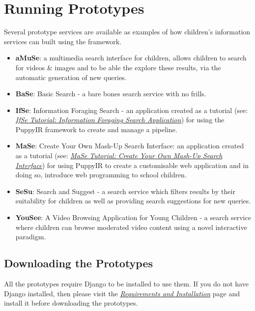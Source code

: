 \documentclass[letterpaper,10pt,english]{sphinxmanual}
\begin{document}
\section{Running Prototypes}
\label{prototypes::doc}\label{prototypes:running-prototypes}\label{prototypes:prototypes}
Several prototype services are available as examples of how children's information services can built using the framework.
\begin{itemize}
\item {} 
\textbf{aMuSe}: a multimedia search interface for children, allows children to search for videos \& images and to be able the explore these results, via the automatic generation of new queries.

\item {} 
\textbf{BaSe}: Basic Search - a bare bones search service with no frills.

\item {} 
\textbf{IfSe}: Information Foraging Search - an application created as a tutorial (see: {\hyperref[ifse-tutorial:information-foraging-puppyir-tutorial]{\emph{IfSe Tutorial: Information Foraging Search Application}}}) for using the PuppyIR framework to create and manage a pipeline.

\item {} 
\textbf{MaSe}: Create Your Own Mash-Up Search Interface: an application created as a tutorial (see: {\hyperref[mase-tutorial:mase-mash-up-search-engine-puppyir-tutorial]{\emph{MaSe Tutorial: Create Your Own Mash-Up Search Interface}}}) for using PuppyIR to create a customisable web application and in doing so, introduce web programming to school children.

\item {} 
\textbf{SeSu}: Search and Suggest - a search service which filters results by their suitability for children as well as providing search suggestions for new queries.

\item {} 
\textbf{YouSee}: A Video Browsing Application for Young Children - a search service where children can browse moderated video content using a novel interactive paradigm.

\end{itemize}


\subsection{Downloading the Prototypes}
\label{prototypes:downloading-the-prototypes}
All the prototypes require Django to be installed to use them. If you do not have Django installed, then please visit the {\hyperref[installation:requirements-and-installation]{\emph{Requirements and Installation}}} page and install it before downloading the prototypes.
\end{document}
